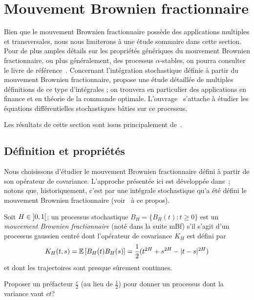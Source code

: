 \section{Mouvement Brownien fractionnaire}

Bien que le mouvement Brownien fractionnaire possède des applications
multiples et transversales, nous nous limiterons à une étude sommaire
dans cette section. Pour de plus amples détails sur les propriétés
génériques du mouvement Brownien fractionnaire, ou plus généralement,
des processus $\alpha$-stables, on pourra consulter le livre de
référence~\cite{samorodnitsky1994}. Concernant l'intégration
stochastique définie à partir du mouvement Brownien fractionnaire,
\cite{biagini2008} propose une étude détaillée de multiples
définitions de ce type d'intégrales ; on trouvera en particulier des
applications en finance et en théorie de la commande
optimale. L'ouvrage~\cite{mishura2008} s'attache à étudier les
équations différentielles stochastiques bâties sur ce processus.

Les résultats de cette section sont issus principalement
de~\cite{biagini2008,nourdin2012}.

\subsection{Définition et propriétés}

Nous choisissons d'étudier le mouvement Brownien fractionnaire défini
à partir de son opérateur de covariance. L'approche présentée ici est
développée dans~\cite{ayache2018}; notons que, historiquement, c'est
par une intégrale stochastique qu'a été défini le mouvement Brownien
fractionnaire (voir~\cite{mandelbrot1968} à ce propos).

\begin{definition}\label{def\string:mBf}
  Soit $H\in\left]0,1\right[$; un processus stochastique
  $B_H = \{B_H(t) : t\geq 0\}$ est un \emph{mouvement Brownien
    fractionnaire} (noté dans
  la suite \og{}mBf\fg{}) s'il s'agit d'un processus gaussien centré
  dont l'opérateur de covariance $K_H$ est défini par
  \[ K_H(t,s) = \mathbb{E}\left[B_H(t)B_H(s)\right] = \frac{1}{2}(t^{2H} + s^{2H} -
    |t-s|^{2H}) \]
  et dont les trajectoires sont presque sûrement continues.
\end{definition}


\begin{question}
  Proposer un préfacteur $\frac{c}{2}$ (au lieu de $\frac{1}{2}$) pour
  donner un processus dont la variance vaut $ct$?
\end{question}

